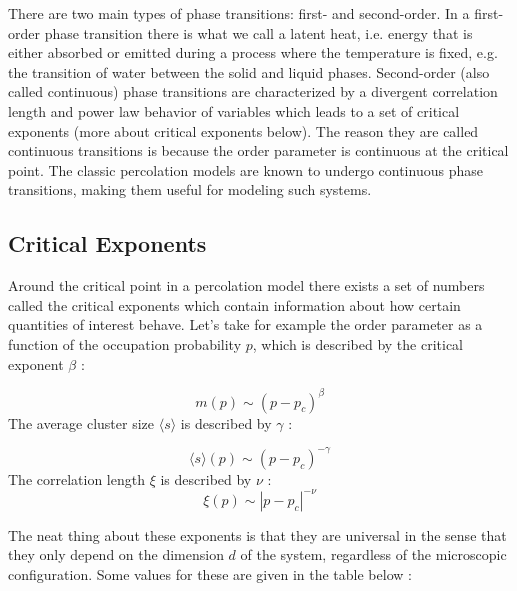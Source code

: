 There are two main types of phase transitions: first- and second-order.
In a first-order phase transition there is what we call a latent heat, i.e. energy that is either absorbed or emitted during a process where the temperature is fixed, e.g. the transition of water between the solid and liquid phases.
Second-order (also called continuous) phase transitions are characterized by a divergent correlation length and power law behavior of variables which leads to a set of critical exponents (more about critical exponents below).
The reason they are called continuous transitions is because the order parameter is continuous at the critical point.
The classic percolation models are known to undergo continuous phase transitions, making them useful for modeling such systems.



\subsection{Critical Exponents}
Around the critical point in a percolation model there exists a set of numbers called the critical exponents which contain information about how certain quantities of interest behave.
Let's take for example the order parameter as a function of the occupation probability $p$, which is described by the critical exponent $\beta$ \cite{intro_to_percolation_theory}:

\begin{equation}
	\label{eqn:crit_exp_P}
	m(p) \sim (p - p_c)^\beta
\end{equation}
The average cluster size $\langle s \rangle$ is described by $\gamma$ \cite{intro_to_percolation_theory}:

\begin{equation}
	\label{eqn:crit_exp_s}
	\langle s \rangle (p) \sim (p - p_c)^{-\gamma}
\end{equation}
The correlation length $\xi$ is described by $\nu$ \cite{intro_to_percolation_theory}:
\begin{equation}
	\label{eqn:crit_exp_xi}
	\xi (p) \sim |p - p_c|^{-\nu}
\end{equation}

The neat thing about these exponents is that they are universal in the sense that they only depend on the dimension $d$ of the system, regardless of the microscopic configuration.
Some values for these are given in the table below \cite{intro_to_percolation_theory}:

